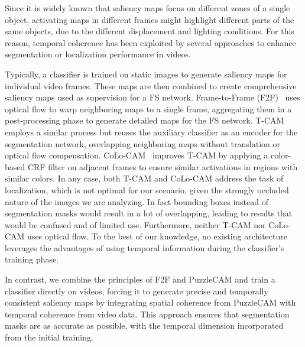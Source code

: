 Since it is widely known that saliency maps focus on different zones of a single object, activating maps in different frames might highlight different parts of the same objects, due to the different displacement and lighting conditions. For this reason, temporal coherence has been exploited by several approaches to enhance segmentation or localization performance in videos. 

Typically, a classifier is trained on static images to generate saliency maps for individual video frames. These maps are then combined to create comprehensive saliency maps used as supervision for a FS network. Frame-to-Frame (F2F)~\cite{lee2019frame} uses optical flow to warp neighboring maps to a single frame, aggregating them in a post-processing phase to generate detailed maps for the FS network. T-CAM~\cite{belharbi2023tcam} employs a similar process but reuses the auxiliary classifier as an encoder for the segmentation network, overlapping neighboring maps without translation or optical flow compensation. CoLo-CAM~\cite{belharbi2023colo} improves T-CAM by applying a color-based CRF filter on adjacent frames to ensure similar activations in regions with similar colors. In any case, both T-CAM and CoLo-CAM address the task of localization, which is not optimal for our scenario, given the strongly occluded nature of the images we are analyzing. In fact bounding boxes instead of segmentation masks would result in a lot of overlapping, leading to results that would be confused and of limited use. Furthermore, neither T-CAM nor CoLo-CAM uses optical flow. To the best of our knowledge, no existing architecture leverages the advantages of using temporal information during the classifier's training phase. 

In contrast, we combine the principles of F2F\cite{lee2019frame} and PuzzleCAM\cite{jo2021puzzle} and train a classifier directly on videos, forcing it to generate precise and temporally consistent saliency maps by integrating spatial coherence from PuzzleCAM with temporal coherence from video data.  This approach ensures that segmentation masks are as accurate as possible, with the temporal dimension incorporated from the initial training.